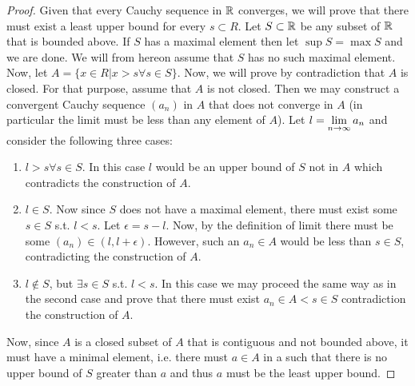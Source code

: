 \begin{proof}
Given that every Cauchy sequence in $\mathbb{R}$ converges, we will prove that there must exist a least upper bound for every $s\subset R$.
Let $S\subset \mathbb{R}$ be any subset of $\mathbb{R}$ that is bounded above. If $S$ has a maximal element then let $\sup S =  \max S$ and we are done. We will from hereon assume that $S$ has no such maximal element. Now, let $A=\{x\in R| x>s \forall s\in S\}$.
Now, we will prove by contradiction that $A$ is closed. For that purpose, assume that $A$ is not closed. Then we may construct a convergent Cauchy sequence $(a_n)$ in $A$ that does not converge in $A$ (in particular the limit must be less than any element of $A$). Let $l = \lim\limits_{n\to\infty} a_n$ and consider the following three cases:
\begin{enumerate}
\item $l>s \forall s\in S$. In this case $l$ would be an upper bound of $S$ not in $A$ which contradicts the construction of $A$.
\item $l\in S$. Now since $S$ does not have a maximal element, there must exist some $s\in S$ s.t. $l<s$. Let $\epsilon=s-l$. Now, by the definition of limit there must be some $(a_n)\in (l,l+\epsilon)$. However, such an $a_n\in A$ would be less than $s\in S$, contradicting the construction of $A$.
\item $l\notin S$, but $\exists s\in S$ s.t. $l<s$. In this case we may proceed the same way as in the second case and prove that there must exist $a_n\in A < s\in S$ contradiction the construction of $A$.
\end{enumerate}
Now, since $A$ is a closed subset of $A$ that is contiguous and not bounded above, it must have a minimal element, i.e. there must $a\in A$ in a such that there is no upper bound of $S$ greater than $a$ and thus $a$ must be the least upper bound.
\end{proof}
